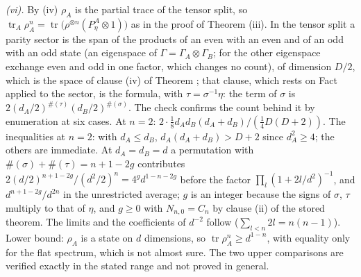 \emph{(vi).} By (iv) $\rho_{A}$ is the partial trace of the tensor split, so $\operatorname{tr}_{A}\rho_{A}^{n} = \operatorname{tr}\bigl(\rho^{\otimes n}(P^{A}_{\eta} \otimes 1)\bigr)$ as in the proof of Theorem (iii). In the tensor split a parity sector is the span of the products of an even with an even and of an odd with an odd state (an eigenspace of $\Gamma = \Gamma_{A} \otimes \Gamma_{B}$; for the other eigenspace exchange even and odd in one factor, which changes no count), of dimension $D/2$, which is the space of clause (iv) of Theorem ; that clause, which rests on Fact  applied to the sector, is the formula, with $\tau = \sigma^{-1}\eta$: the term of $\sigma$ is $2(d_{A}/2)^{\#(\tau)}(d_{B}/2)^{\#(\sigma)}$. The check confirms the count behind it by enumeration at six cases. At $n = 2$: $2\cdot\tfrac18 d_{A}d_{B}(d_{A} + d_{B})/(\tfrac14 D(D + 2))$. The inequalities at $n = 2$: with $d_{A} \le d_{B}$, $d_{A}(d_{A} + d_{B}) > D + 2$ since $d_{A}^{2} \ge 4$; the others are immediate. At $d_{A} = d_{B} = d$ a permutation with $\#(\sigma) + \#(\tau) = n + 1 - 2g$ contributes $2(d/2)^{n+1-2g}/(d^{2}/2)^{n} = 4^{g}d^{1-n-2g}$ before the factor $\prod_{l}(1 + 2l/d^{2})^{-1}$, and $d^{n+1-2g}/d^{2n}$ in the unrestricted average; $g$ is an integer because the signs of $\sigma$, $\tau$ multiply to that of $\eta$, and $g \ge 0$ with $N_{n,0} = C_{n}$ by clause (ii) of the stored theorem. The limits and the coefficients of $d^{-2}$ follow ($\sum_{l<n}2l = n(n-1)$). Lower bound: $\rho_{A}$ is a state on $d$ dimensions, so $\operatorname{tr}\rho_{A}^{n} \ge d^{1-n}$, with equality only for the flat spectrum, which is not almost sure. The two upper comparisons are verified exactly in the stated range and not proved in general.

